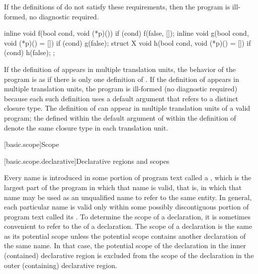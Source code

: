 If the definitions of
 do not satisfy these requirements, then
the program is ill-formed, no diagnostic required.%
\begin{example}
\begin{codeblock}
inline void f(bool cond, void (*p)()) {
  if (cond) f(false, []{});
}
inline void g(bool cond, void (*p)() = []{}) {
  if (cond) g(false);
}
struct X {
  void h(bool cond, void (*p)() = []{}) {
    if (cond) h(false);
  }
};
\end{codeblock}

If the definition of  appears in multiple translation units,
the behavior of the program is as if
there is only one definition of .
If the definition of  appears in multiple translation units,
the program is ill-formed (no diagnostic required) because
each such definition uses a default argument that
refers to a distinct  closure type.
The definition of  can appear
in multiple translation units of a valid program;
the  defined within
the default argument of  within the definition of 
denote the same closure type in each translation unit.
\end{example}

[basic.scope]{Scope}%

[basic.scope.declarative]{Declarative regions and scopes}%

\pnum
{}%
Every name is introduced in some portion of program text called a
%
%
, which is the largest part of the program
in which that name is valid, that is, in which that name may
be used as an unqualified name to refer to the same entity. In general,
each particular name is valid only within some possibly discontiguous
portion of program text called its . To determine the
scope of a declaration, it is sometimes convenient to refer to the
 of a declaration. The scope of a declaration
is the same as its potential scope unless the potential scope contains
another declaration of the same name. In that case, the potential scope
of the declaration in the inner (contained) declarative region is
excluded from the scope of the declaration in the outer (containing)
declarative region.

